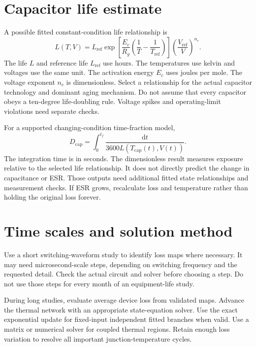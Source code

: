 \documentclass[11pt,a4paper]{report}
\newcommand{\dd}{\mathrm{d}}
\begin{document}
\section{Capacitor life estimate}
A possible fitted constant-condition life relationship is
\begin{equation}
L(T,V)=L_{\mathrm{ref}}
\exp\!\left[\frac{E_c}{R_g}\left(\frac{1}{T}-\frac{1}{T_{\mathrm{ref}}}\right)\right]
\left(\frac{V_{\mathrm{ref}}}{V}\right)^{n_c}.
\end{equation}
The life $L$ and reference life $L_{\mathrm{ref}}$ use hours.
The temperatures use kelvin and voltages use the same unit.
The activation energy $E_c$ uses joules per mole.
The voltage exponent $n_c$ is dimensionless.
Select a relationship for the actual capacitor technology and dominant aging mechanism.
Do not assume that every capacitor obeys a ten-degree life-doubling rule.
Voltage spikes and operating-limit violations need separate checks.

For a supported changing-condition time-fraction model,
\begin{equation}
D_{\mathrm{cap}}=\int_0^{t_f}\frac{\dd t}{3600L(T_{\mathrm{cap}}(t),V(t))}.
\end{equation}
The integration time is in seconds.
The dimensionless result measures exposure relative to the selected life relationship.
It does not directly predict the change in capacitance or ESR.
Those outputs need additional fitted state relationships and measurement checks.
If ESR grows, recalculate loss and temperature rather than holding the original loss forever.

\section{Time scales and solution method}
Use a short switching-waveform study to identify loss maps where necessary.
It may need microsecond-scale steps, depending on switching frequency and the requested detail.
Check the actual circuit and solver before choosing a step.
Do not use those steps for every month of an equipment-life study.

During long studies, evaluate average device loss from validated maps.
Advance the thermal network with an appropriate state-equation solver.
Use the exact exponential update for fixed-input independent fitted branches when valid.
Use a matrix or numerical solver for coupled thermal regions.
Retain enough loss variation to resolve all important junction-temperature cycles.
\end{document}
